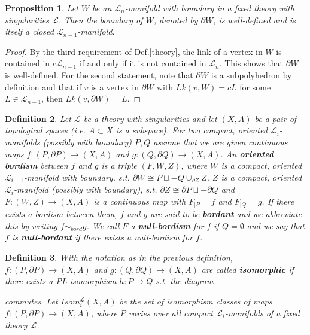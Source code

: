 \documentclass{scrreprt}
\newtheorem{prop}{Proposition}[chapter]
\newtheorem{definition}[prop]{Definition}
\begin{document}
\begin{prop}
Let $W$ be an $\mathcal{L}_n$-manifold with boundary in a fixed theory with singularities $\mathcal{L}$. Then the boundary of $W$, denoted by $\partial W$, is well-defined and is itself a closed $\mathcal{L}_{n-1}$-manifold.
\end{prop}

\begin{proof}
By the third requirement of Def.\ref{theory}, the link of a vertex in $W$ is contained in $c \mathcal{L}_{n-1}$ if and only if it is not contained in $\mathcal{L}_n$. This shows that $\partial W$ is well-defined. For the second statement, note that $\partial W$ is a subpolyhedron by definition and that if $v$ is a vertex in $\partial W$ with $Lk(v,W)=cL$ for some $L \in \mathcal{L}_{n-1}$, then $Lk(v,\partial W) = L$.
\end{proof}

\begin{definition}\label{bordismusdef}
Let $\mathcal{L}$ be a theory with singularities and let $(X,A)$ be a pair of topological spaces (i.e. $A \subset X$ is a subspace). For two compact, oriented $\mathcal{L}_i$-manifolds (possibly with boundary) $P,Q$  assume that we are given continuous maps $f:(P, \partial P) \to (X,A)$ and $g:(Q , \partial Q) \to (X,A)$. An \textbf{oriented bordism} between $f$ and $g$ is a triple $(F,W,Z)$, where $W$ is a compact, oriented $\mathcal{L}_{i+1}$-manifold with boundary, s.t. $\partial W \cong P \sqcup -Q \cup_{\partial Z} Z$, $Z$ is a compact, oriented $\mathcal{L}_i$-manifold (possibly with boundary), s.t. $\partial Z\cong \partial P \sqcup - \partial Q$ and $F: (W,Z) \to (X,A)$ is a continuous map with $F _{|P} = f$ and $F_{|Q}=g$. If there exists a bordism between them, $f$ and $g$ are said to be \textbf{bordant} and we abbreviate this by writing $f \sim_{bord} g$. We call $F$ a \textbf{null-bordism} for $f$ if $Q= \emptyset$ and we say that $f$ is \textbf{null-bordant} if there exists a null-bordism for $f$.
\end{definition}

\begin{definition}\label{isomorphiedef}
With the notation as in the previous definition, $f: (P, \partial P) \to (X,A)$ and $g: (Q, \partial Q) \to (X,A)$ are called \textbf{isomorphic} if there exists a PL isomorphism $h : P \to Q$ s.t. the diagram \newline
\begin{xy}
\end{xy}
\newline
commutes. Let $Isom_{i}^{\mathcal{L}}(X,A)$ be the set of isomorphism classes of maps \\ $f: (P, \partial P) \to (X,A)$, where $P$ varies over all compact $\mathcal{L}_i$-manifolds of a fixed theory $\mathcal{L}$.
\end{definition}
\end{document}
